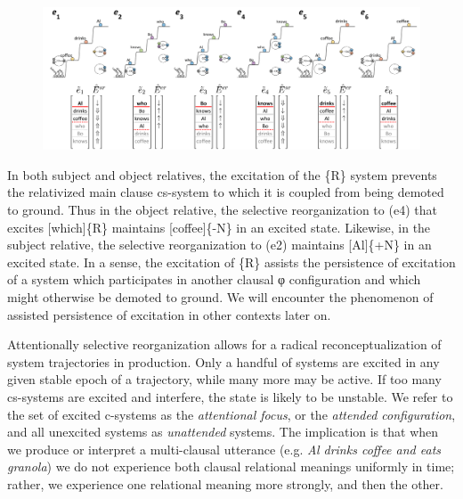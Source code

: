   
\begin{figure}
\includegraphics[width=\textwidth]{figures/Tilsen-img103.png}
\caption{\missingcaption}
\label{fig:4:53}
\end{figure}
 

  In both subject and object relatives, the excitation of the \{R\} system prevents the relativized main clause cs-system to which it is coupled from being demoted to ground. Thus in the object relative, the selective reorganization to (e4) that excites [which]\{R\} maintains [coffee]\{-N\} in an excited state. Likewise, in the subject relative, the selective reorganization to (e2) maintains [Al]\{+N\} in an excited state. In a sense, the excitation of \{R\} assists the persistence of excitation of a system which participates in another clausal φ configuration and which might otherwise be demoted to ground. We will encounter the phenomenon of assisted persistence of excitation in other contexts later on.

Attentionally selective reorganization allows for a radical reconceptualization of system trajectories in production.  Only a handful of systems are excited in any given stable epoch of a trajectory, while many more may be active. If too many cs-systems are excited and interfere, the state is likely to be unstable. We refer to the set of excited c-systems as the \textit{attentional focus}, or the \textit{attended configuration}, and all unexcited systems as \textit{unattended} systems. The implication is that when we produce or interpret a multi-clausal utterance (e.g. \textit{Al drinks coffee and eats granola}) we do not experience both clausal relational meanings uniformly in time; rather, we experience one relational meaning more strongly, and then the other.

